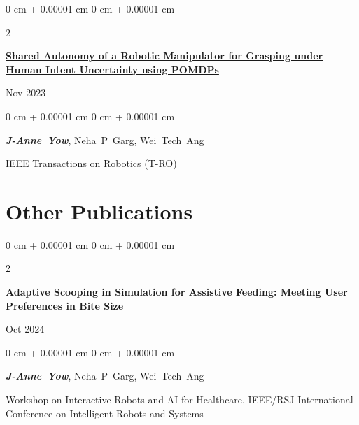 \documentclass[10pt, letterpaper]{article}
\newenvironment{onecolentry}{
    \begin{adjustwidth}{
        0 cm + 0.00001 cm
    }{
        0 cm + 0.00001 cm
    }
}{
    \end{adjustwidth}
} %
\newenvironment{twocolentry}[2][]{
    \onecolentry
    \def\secondColumn{#2}
    \setcolumnwidth{\fill, 4.5 cm}
    \begin{paracol}{2}
}{
    \switchcolumn \raggedleft \secondColumn
    \end{paracol}
    \endonecolentry
} %
\begin{document}
        \vspace{0.2 cm}

        \begin{samepage}
            \begin{twocolentry}{
                Nov 2023
            }
                \textbf{\href{https://ieeexplore.ieee.org/document/10323205}{Shared Autonomy of a Robotic Manipulator for Grasping under Human Intent Uncertainty using POMDPs}}
            \end{twocolentry}

            \vspace{0.10 cm}
            
            \begin{onecolentry}
                \mbox{\textbf{\textit{J-Anne Yow}}}, \mbox{Neha P Garg}, \mbox{Wei Tech Ang}

                \vspace{0.10 cm}
                
        IEEE Transactions on Robotics (T-RO)\end{onecolentry}
        \end{samepage}


    
    \section{Other Publications}



        
        \begin{samepage}
            \begin{twocolentry}{
                Oct 2024
            }
                \textbf{Adaptive Scooping in Simulation for Assistive Feeding: Meeting User Preferences in Bite Size}
            \end{twocolentry}

            \vspace{0.10 cm}
            
            \begin{onecolentry}
                \mbox{\textbf{\textit{J-Anne Yow}}}, \mbox{Neha P Garg}, \mbox{Wei Tech Ang}

                \vspace{0.10 cm}
                
        Workshop on Interactive Robots and AI for Healthcare, IEEE/RSJ International Conference on Intelligent Robots and Systems\end{onecolentry}
        \end{samepage}
\end{document}
